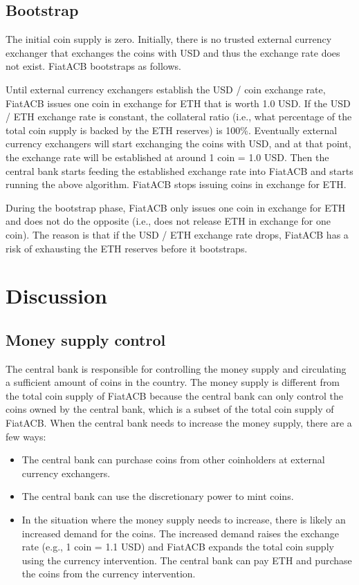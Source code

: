 \documentclass[dvipdfmx,a4paper]{article}
\begin{document}
\subsection{Bootstrap}

The initial coin supply is zero. Initially, there is no trusted external currency exchanger that exchanges the coins with USD and thus the exchange rate does not exist. FiatACB bootstraps as follows.

Until external currency exchangers establish the USD / coin exchange rate, FiatACB issues one coin in exchange for ETH that is worth 1.0 USD. If the USD / ETH exchange rate is constant, the collateral ratio (i.e., what percentage of the total coin supply is backed by the ETH reserves) is 100\%. Eventually external currency exchangers will start exchanging the coins with USD, and at that point, the exchange rate will be established at around 1 coin = 1.0 USD. Then the central bank starts feeding the established exchange rate into FiatACB and starts running the above algorithm. FiatACB stops issuing coins in exchange for ETH.

During the bootstrap phase, FiatACB only issues one coin in exchange for ETH and does not do the opposite (i.e., does not release ETH in exchange for one coin). The reason is that if the USD / ETH exchange rate drops, FiatACB has a risk of exhausting the ETH reserves before it bootstraps.

\section{Discussion}

\subsection{Money supply control}

The central bank is responsible for controlling the money supply and circulating a sufficient amount of coins in the country. The money supply is different from the total coin supply of FiatACB because the central bank can only control the coins owned by the central bank, which is a subset of the total coin supply of FiatACB. When the central bank needs to increase the money supply, there are a few ways:

\begin{itemize}
\item The central bank can purchase coins from other coinholders at external currency exchangers.
\item The central bank can use the discretionary power to mint coins.
\item In the situation where the money supply needs to increase, there is likely an increased demand for the coins. The increased demand raises the exchange rate (e.g., 1 coin = 1.1 USD) and FiatACB expands the total coin supply using the currency intervention. The central bank can pay ETH and purchase the coins from the currency intervention.
\end{itemize}
\end{document}
